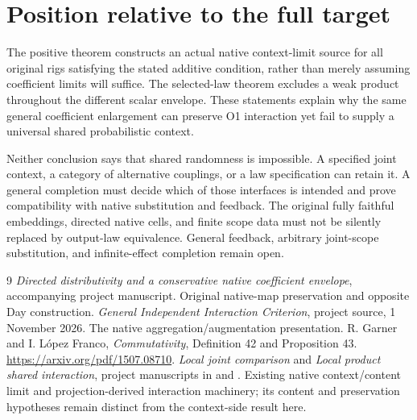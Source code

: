\documentclass[11pt]{article}
\begin{document}
\section{Position relative to the full target}
The positive theorem constructs an actual native context-limit source for all original rigs satisfying the stated additive condition, rather than merely assuming coefficient limits will suffice. The selected-law theorem excludes a weak product throughout the different scalar envelope. These statements explain why the same general coefficient enlargement can preserve O1 interaction yet fail to supply a universal shared probabilistic context.

Neither conclusion says that shared randomness is impossible. A specified joint context, a category of alternative couplings, or a law specification can retain it. A general completion must decide which of those interfaces is intended and prove compatibility with native substitution and feedback. The original fully faithful embeddings, directed native cells, and finite scope data must not be silently replaced by output-law equivalence. General feedback, arbitrary joint-scope substitution, and infinite-effect completion remain open.

\begin{thebibliography}{9}
 \emph{Directed distributivity and a conservative native coefficient envelope}, accompanying project manuscript. Original native-map preservation and opposite Day construction.
 \emph{General Independent Interaction Criterion}, project source, 1 November 2026. The native aggregation/augmentation presentation.
 R. Garner and I. L\'opez Franco, \emph{Commutativity}, Definition 42 and Proposition 43. \url{https://arxiv.org/pdf/1507.08710}.
 \emph{Local joint comparison} and \emph{Local product shared interaction}, project manuscripts in  and . Existing native context/content limit and projection-derived interaction machinery; its content and preservation hypotheses remain distinct from the context-side result here.
\end{thebibliography}
\end{document}
